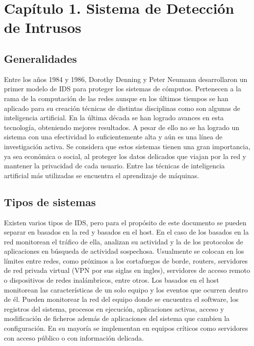 \chapter*{Capítulo 1. Sistema de Detección de Intrusos}\label{chapter:ids}

\section{Generalidades}
Entre los años 1984 y 1986, Dorothy Denning y Peter Neumann desarrollaron un primer modelo de IDS \cite{denning1985requirements} para proteger los sistemas de cómputos. Pertenecen a la rama de la computación de las redes aunque en los últimos tiempos se han aplicado para su creación técnicas de distintas disciplinas como son algunas de inteligencia artificial. En la última década se han logrado avances en esta tecnología, obteniendo mejores resultados. A pesar de ello no se ha logrado un sistema con una efectividad lo suficientemente alta y aún es una línea de investigación activa. Se considera que estos sistemas tienen una gran importancia, ya sea económica o social, al proteger los datos delicados que viajan por la red y mantener la privacidad de cada usuario. Entre las técnicas de inteligencia artificial más utilizadas se encuentra el aprendizaje de máquinas.

\section{Tipos de sistemas}
Existen varios tipos de IDS, pero para el propósito de este documento se pueden separar en basados en la red y basados en el host. En el caso de los basados en la red monitorean el tráfico de ella, analizan su actividad y la de los protocolos de aplicaciones en búsqueda de actividad sospechosa. Usualmente se colocan en los límites entre redes, como próximos a los cortafuegos de borde, routers, servidores de red privada virtual (VPN por sus siglas en ingles), servidores de acceso remoto o dispositivos de redes inalámbricos, entre otros. Los basados en el host monitorean las características de un solo equipo y los eventos que ocurren dentro de él. Pueden monitorear la red del equipo donde se encuentra el software, los registros del sistema, procesos en ejecución, aplicaciones activas, acceso y modificación de ficheros además de aplicaciones del sistema que cambien la configuración. En su mayoría se implementan en equipos críticos como servidores con acceso público o con información delicada.


